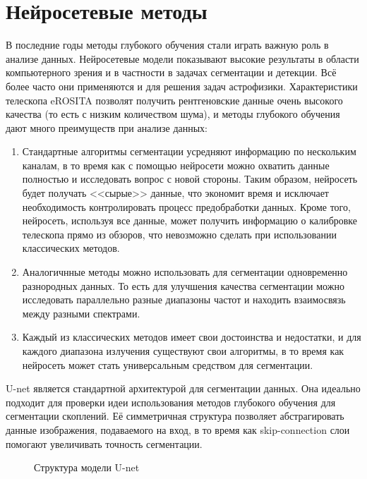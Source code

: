 \section{Нейросетевые методы}
В последние годы методы глубокого обучения стали играть важную роль в анализе данных. Нейросетевые 
модели показывают высокие результаты в области компьютерного зрения и в частности в задачах 
сегментации и детекции. Всё более часто они применяются и для решения задач астрофизики. 
Характеристики телескопа eROSITA позволят получить рентгеновские данные очень высокого качества (то 
есть с низким количеством шума), и методы глубокого обучения дают много преимуществ при анализе 
данных: 

\begin{enumerate}
    \item Стандартные алгоритмы сегментации усредняют информацию по нескольким каналам,
        в то время как с помощью нейросети можно охватить данные полностью и исследовать вопрос с 
        новой стороны. Таким образом, нейросеть будет получать <<сырые>> данные, что экономит время 
        и исключает необходимость контролировать процесс предобработки данных. 
        Кроме того, нейросеть, используя все данные, может получить информацию о 
        калибровке телескопа прямо из обзоров, что невозможно сделать при использовании классических 
        методов.
    \item Аналогичнные методы можно использовать для сегментации одновременно разнородных данных. 
        То есть для улучшения качества сегментации можно исследовать параллельно разные диапазоны 
        частот и находить взаимосвязь между разными спектрами.
    \item Каждый из классических методов имеет свои достоинства и недостатки, и для каждого 
        диапазона излучения существуют свои алгоритмы, в то время как 
        нейросеть может стать универсальным средством для сегментации.
\end{enumerate}

U-net \cite{Unet} является стандартной архитектурой для сегментации данных. Она идеально подходит 
для проверки идеи использования методов глубокого обучения для сегментации скоплений.
Её симметричная структура позволяет абстрагировать данные изображения, подаваемого на 
вход, в то время как skip-connection слои помогают увеличивать точность сегментации.

\begin{figure}[h]
    \caption{Структура модели U-net \cite{Unet}}
\end{figure}


